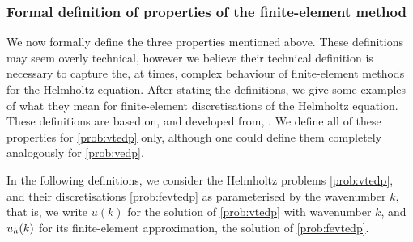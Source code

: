 





\subsubsection{Formal definition of properties of the finite-element method}\label{sec:femprops}

We now formally define the three properties mentioned above. These definitions may seem overly technical, however we believe their technical definition is necessary to capture the, at times, complex behaviour of finite-element methods for the Helmholtz equation. After stating the definitions, we give some examples of what they mean for finite-element discretisations of the Helmholtz equation. These definitions are based on, and developed from, \cite[Definition 2.3]{DiMoSp:19}. We define all of these properties for \cref{prob:vtedp} only, although one could define them completely analogously for \cref{prob:vedp}.

In the following definitions, we consider the Helmholtz problems \cref{prob:vtedp}, and their discretisations \cref{prob:fevtedp} as parameterised by the wavenumber $k,$ that is, we write $u(k)$ for the solution of \cref{prob:vtedp} with wavenumber $k$, and $u_{h}(k)$ for its finite-element approximation, the solution of \cref{prob:fevtedp}.


